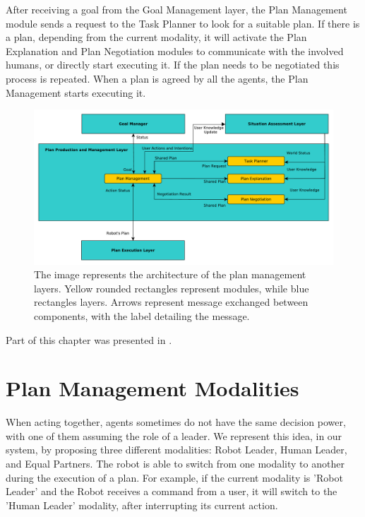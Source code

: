 After receiving a goal from the Goal Management layer, the Plan Management module sends a request to the Task Planner to look for a suitable plan. If there is a plan, depending from the current modality, it will activate the Plan Explanation and Plan Negotiation modules to communicate with the involved humans, or directly start executing it. If the plan needs to be negotiated this process is repeated. When a plan is agreed by all the agents, the Plan Management starts executing it. 

\begin{figure}[ht!]
	\centering
	\includegraphics[scale=0.5]{img/plan_management/architecture.pdf}
	\caption{The image represents the architecture of the plan management layers. Yellow rounded rectangles represent modules, while blue rectangles layers. Arrows represent message exchanged between components, with the label detailing the message. }
	\label{fig:plan_management-architecture}
\end{figure}


Part of this chapter was presented in \cite{Lallement2014,milliez2016using,fioreiser2014}.

\section{Plan Management Modalities}
\label{sec:plan_management-modalities}
When acting together, agents sometimes do not have the same decision power, with one of them assuming the role of a leader. We represent this idea, in our system, by proposing three different modalities: Robot Leader, Human Leader, and Equal Partners. The robot is able to switch from one modality to another during the execution of a plan. For example, if the current modality is 'Robot Leader' and the Robot receives a command from a user, it will switch to the 'Human Leader' modality, after interrupting its current action.

